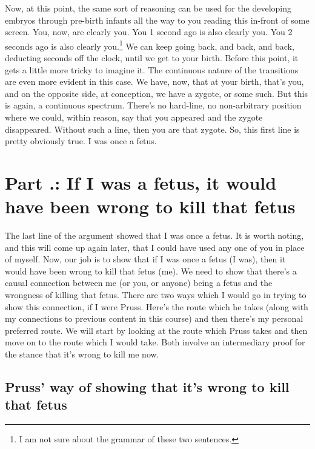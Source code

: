 Now, at this point, the same sort of reasoning can be used for the developing embryos through pre-birth infants all the way to you reading this in-front of some screen. You, now, are clearly you. You 1 second ago is also clearly you. You 2 seconds ago is also clearly you.\footnote{ I am not sure about the grammar of these two sentences.} We can keep going back, and back, and back, deducting seconds off the clock, until we get to your birth. Before this point, it gets a little more tricky to imagine it. The continuous nature of the transitions are even more evident in this case. We have, now, that at your birth, that's you, and on the opposite side, at conception, we have a zygote, or some such. But this is again, a continuous spectrum. There's no hard-line, no non-arbitrary position where we could, within reason, say that you appeared and the zygote disappeared.  Without such a line, then you are that zygote. So, this first line is pretty obviously true. I was once a fetus.

\section{Part \thechapcount.\theseccount: If I was a fetus, it would have been wrong to kill that fetus}

The last line of the argument showed that I was once a fetus. It is worth noting, and this will come up again later, that I could have used any one of you in place of myself. Now, our job is to show that if I was once a fetus (I was), then it would have been wrong to kill that fetus (me). We need to show that there's a causal connection between me (or you, or anyone) being a fetus and the wrongness of killing that fetus. There are two ways which I would go in trying to show this connection, if I were Pruss. Here's the route which he takes  (along with my connections to previous content in this course) and then there's my personal preferred route. We will start by looking at the route which Pruss takes and then move on to the route which I would take. Both involve an intermediary proof for the stance that it's wrong to kill me now. 
\subsection{Pruss' way of showing that it's wrong to kill that fetus}


